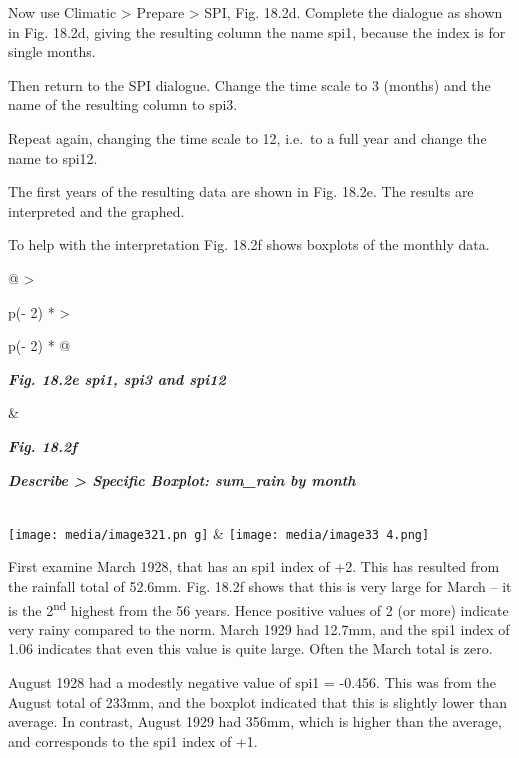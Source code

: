 \documentclass[
  letterpaper,
  DIV=11,
  numbers=noendperiod]{scrreprt}
\begin{document}
Now use Climatic \textgreater{} Prepare \textgreater{} SPI, Fig. 18.2d.
Complete the dialogue as shown in Fig. 18.2d, giving the resulting
column the name spi1, because the index is for single months.

Then return to the SPI dialogue. Change the time scale to 3 (months) and
the name of the resulting column to spi3.

Repeat again, changing the time scale to 12, i.e.~to a full year and
change the name to spi12.

The first years of the resulting data are shown in Fig. 18.2e. The
results are interpreted and the graphed.

To help with the interpretation Fig. 18.2f shows boxplots of the monthly
data.

\begin{longtable}[]{@{}
  >{\raggedright\arraybackslash}p{(\columnwidth - 2\tabcolsep) * }
  >{\raggedright\arraybackslash}p{(\columnwidth - 2\tabcolsep) * }@{}}
\toprule\noalign{}
\begin{minipage}[b]{\linewidth}\raggedright
\textbf{\emph{Fig. 18.2e spi1, spi3 and spi12}}
\end{minipage} & \begin{minipage}[b]{\linewidth}\raggedright
\textbf{\emph{Fig. 18.2f}}

\textbf{\emph{Describe \textgreater{} Specific Boxplot: sum\_rain by
month}}
\end{minipage} \\
\midrule\noalign{}
\endhead
\bottomrule\noalign{}
\endlastfoot
\texttt{[image: media/image321.pn g]}
&
\texttt{[image: media/image33 4.png]} \\
\end{longtable}

First examine March 1928, that has an spi1 index of +2. This has
resulted from the rainfall total of 52.6mm. Fig. 18.2f shows that this
is very large for March -- it is the 2\textsuperscript{nd} highest from
the 56 years. Hence positive values of 2 (or more) indicate very rainy
compared to the norm. March 1929 had 12.7mm, and the spi1 index of 1.06
indicates that even this value is quite large. Often the March total is
zero.

August 1928 had a modestly negative value of spi1 = -0.456. This was
from the August total of 233mm, and the boxplot indicated that this is
slightly lower than average. In contrast, August 1929 had 356mm, which
is higher than the average, and corresponds to the spi1 index of +1.
\end{document}
